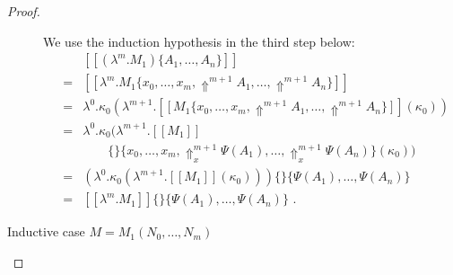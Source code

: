 \documentclass[a4paper,11pt,draft]{article}
\begin{document}
\begin{proof}
\begin{description}
  We use the induction hypothesis in the third step below:
  \begin{eqnarray*} %
    &   & [\![(\lambda^{m}.M_{1})\{A_{1}, \ldots, A_{n}\}]\!] \\
    & = & [\![\lambda^{m}.M_{1}\{x_{0}, \ldots, x_{m}, \Uparrow^{m+1}A_{1}, \ldots, \Uparrow^{m+1}A_{n}\}]\!] \\
    & = & \lambda^{0}.\kappa_{0}(\lambda^{m+1}.[\![M_{1}\{x_{0}, \ldots, x_{m}, \Uparrow^{m+1}A_{1}, \ldots, \Uparrow^{m+1}A_{n}\}]\!](\kappa_{0})) \\
    & = & \lambda^{0}.\kappa_{0}(\lambda^{m+1}.[\![M_{1}]\!] \\
    &   & \qquad \{\}\{x_{0}, \ldots, x_{m}, \Uparrow_{x}^{m+1}\Psi(A_{1}), \ldots, \Uparrow_{x}^{m+1}\Psi(A_{n})\}(\kappa_{0})) \\
    & = & (\lambda^{0}.\kappa_{0}(\lambda^{m+1}.[\![M_{1}]\!](\kappa_{0})))\{\}\{\Psi(A_{1}), \ldots, \Psi(A_{n})\} \\
    & = & [\![\lambda^{m}.M_{1}]\!]\{\}\{\Psi(A_{1}), \ldots, \Psi(A_{n})\} \text{ .}
  \end{eqnarray*}

\item[\sffamily Inductive case $M = M_{1}(N_{0}, \ldots, N_{m})$]\hfill


\end{description}
\end{proof}
\end{document}
